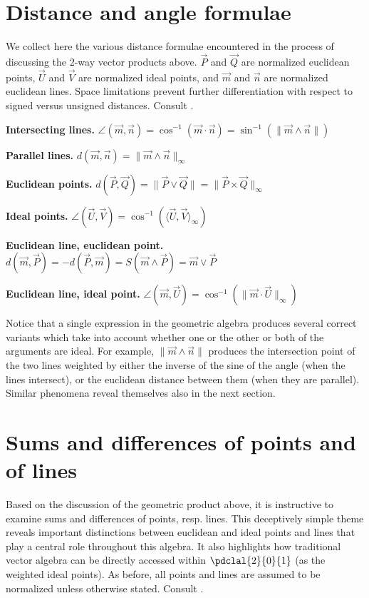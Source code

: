 \documentclass{birkjour}
\begin{document}
\section{Distance and angle formulae}
\label{sec:daf}
We collect here the various distance formulae  encountered in the process of discussing the 2-way vector products above.  $\vec{P}$ and $\vec{Q}$ are normalized euclidean points, $\vec{U}$ and $\vec{V}$ are normalized ideal points, and $\vec{m}$ and $\vec{n}$ are normalized euclidean lines.  Space limitations prevent further differentiation with respect to signed versus unsigned distances. Consult .
\begin{compactenum}
\item \textbf{Intersecting lines.} $\angle(\vec{m},\vec{n}) = \cos^{-1}{(\vec{m} \cdot \vec{n})} = \sin^{-1}{(\| \vec{m} \wedge \vec{n} \|)}$
\item \textbf{Parallel lines.} $d(\vec{m}, \vec{n}) = \|\vec{m} \wedge \vec{n}\|_\infty$
\item \textbf{Euclidean points.} $d(\vec{P},\vec{Q}) = \|\vec{P} \vee \vec{Q} \| = \| \vec{P} \times \vec{Q} \|_\infty$
\item \textbf{Ideal points.} $\angle(\vec{U}, \vec{V}) = \cos^{-1}(\langle \vec{U}, \vec{V} \rangle_{\infty})$
\item \textbf{Euclidean line, euclidean point.} $d(\vec{m}, \vec{P})  = -d(\vec{P}, \vec{m}) = S(\vec{m} \wedge \vec{P}) = \vec{m} \vee \vec{P} $
\item \textbf{Euclidean line, ideal point.} $\angle(\vec{m}, \vec{U}) = \cos^{-1}{(\| \vec{m} \cdot \vec{U} \|_{\infty})}$
\end{compactenum}
Notice that  a single expression in the geometric algebra produces several correct variants which take into account whether one or the other or both of the arguments are ideal.  For example, $ \|\vec{m} \wedge \vec{n}\|$ produces the intersection point of the two lines weighted by either the inverse of the sine of the angle (when the lines intersect), or the euclidean distance between them (when they are parallel).  Similar phenomena reveal themselves also in the next section.
\vspace{-.1in}
 
 \section{Sums and differences of points and of lines}
 \label{sec:sumdiff}
 Based on the discussion of the geometric product above,
it is instructive to examine sums and differences of points, resp. lines.  This deceptively simple theme reveals important distinctions between euclidean and ideal points and lines that play a central role throughout this algebra. It also highlights how traditional vector algebra can be directly accessed within $\pdclal{2}{0}{1}$ (as the weighted ideal points).   As before, all points and lines are assumed to be normalized unless otherwise stated. Consult .
 
\end{document}
